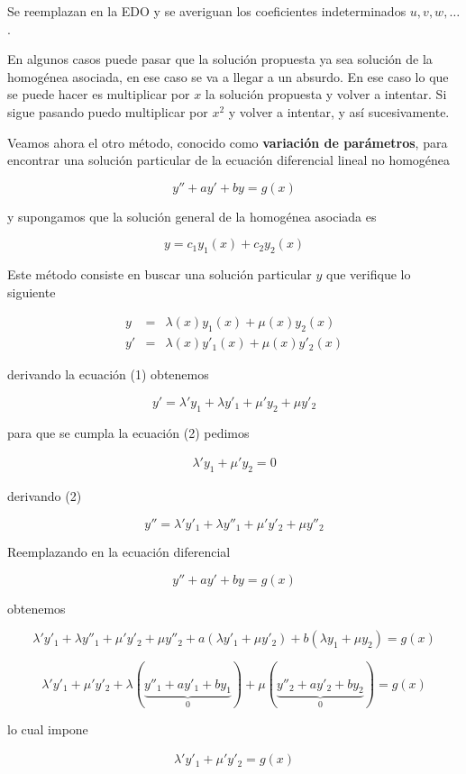 Se reemplazan en la EDO y se averiguan los coeficientes indeterminados $u,v,w, \ldots$.

En algunos casos puede pasar que la solución propuesta ya sea solución de la homogénea asociada, en ese caso se va a llegar a un absurdo.  En ese caso lo que se puede hacer es multiplicar por $x$ la solución propuesta y volver a intentar.  Si sigue pasando puedo multiplicar por $x^2$ y volver a intentar, y así sucesivamente.


Veamos ahora el otro método, conocido como \textbf{variación de parámetros}, para encontrar una solución particular de la ecuación diferencial lineal no homogénea

$$ y'' + ay' + by = g(x) $$

y supongamos que la solución general de la homogénea asociada es

$$ y = c_1 y_1(x) + c_2 y_2(x) $$

Este método consiste en buscar una solución particular $y$ que verifique lo siguiente

\begin{eqnarray} y &=& \lambda(x) y_1(x) + \mu(x) y_2(x) \\
y' &=& \lambda(x) y'_1(x) + \mu(x) y'_2(x) \end{eqnarray}

derivando la ecuación (1) obtenemos

$$ y' = \lambda' y_1 + \lambda y'_1 + \mu' y_2 + \mu y'_2$$

para que se cumpla la ecuación (2) pedimos

\begin{eqnarray} \lambda' y_1 + \mu' y_2 = 0 \end{eqnarray}

derivando (2)

$$ y'' = \lambda' y'_1 + \lambda y''_1 + \mu' y'_2 + \mu y''_2$$

Reemplazando en la ecuación diferencial

$$ y'' + ay' + by = g(x) $$

obtenemos

$$ \lambda' y'_1 + \lambda y''_1 + \mu' y'_2 + \mu y''_2 + a (\lambda y'_1 + \mu y'_2) + b (\lambda y_1 + \mu y_2) = g(x) $$

$$ \lambda' y'_1 + \mu' y'_2 + \lambda (\underbrace{ y''_1 + a y'_1 + b y_1}_{0}) + \mu (\underbrace{y''_2 + a y'_2 + b y_2}_{0}) = g(x) $$

lo cual impone

\begin{eqnarray} \lambda' y'_1 + \mu' y'_2 = g(x) \end{eqnarray}

